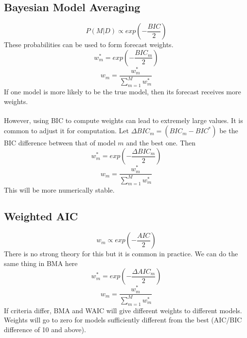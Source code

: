 \documentclass{article}
\begin{document}
\subsection{Bayesian Model Averaging}
$$P(M|D) \propto exp\left(-\frac{BIC}{2}\right)$$
These probabilities can be used to form forecast weights.
$$w_m^* = exp\left(-\frac{BIC_m}{2}\right)$$
$$w_m = \frac{w_m^*}{\sum_{m=1}^M w_m^*}$$
If one model is more likely to be the true model, then its forecast receives more weights.\\
\\
However, using BIC to compute weights can lead to extremely large values. It is common to adjust it for computation. Let $\Delta BIC_m = (BIC_m - BIC^*)$ be the BIC difference between that of model $m$ and the best one. Then
$$w_m^* = exp\left(-\frac{\Delta BIC_m}{2}\right)$$
$$w_m = \frac{w_m^*}{\sum_{m=1}^M w_m^*}$$
This will be more numerically stable.

\subsection{Weighted AIC}
$$w_m \propto exp\left(-\frac{AIC}{2}\right)$$
There is no strong theory for this but it is common in practice. We can do the same thing in BMA here
$$w_m^* = exp\left(-\frac{\Delta AIC_m}{2}\right)$$
$$w_m = \frac{w_m^*}{\sum_{m=1}^M w_m^*}$$
If criteria differ, BMA and WAIC will give different weights to different models. Weights will go to zero for models sufficiently different from the best (AIC/BIC difference of 10 and above).
\end{document}
